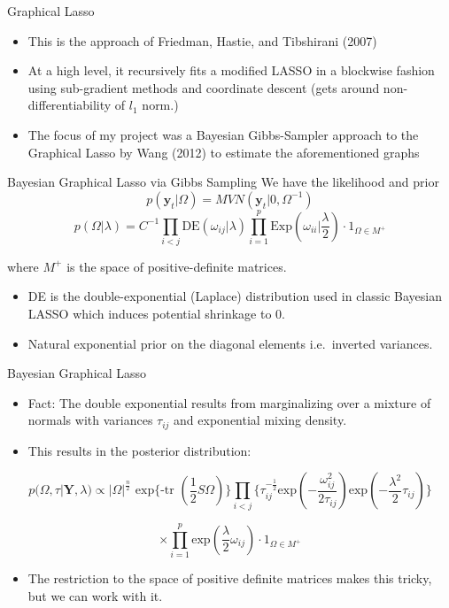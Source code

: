 \documentclass[
  ignorenonframetext,
]{beamer}
\providecommand{\tightlist}{%
  \setlength{\itemsep}{0pt}\setlength{\parskip}{0pt}}
\begin{document}
\begin{frame}{Graphical Lasso}
\label{graphical-lasso-1}
\begin{itemize}
\item
  This is the approach of Friedman, Hastie, and Tibshirani (2007)
\item
  At a high level, it recursively fits a modified LASSO in a blockwise
  fashion using sub-gradient methods and coordinate descent (gets around
  non-differentiability of \(l_1\) norm.)
\item
  The focus of my project was a Bayesian Gibbs-Sampler approach to the
  Graphical Lasso by Wang (2012) to estimate the aforementioned graphs
\end{itemize}
\end{frame}

\begin{frame}{Bayesian Graphical Lasso via Gibbs Sampling}
\label{bayesian-graphical-lasso-via-gibbs-sampling}
We have the likelihood and prior
\[p(\textbf{y}_t | \Omega) = MVN(\textbf{y}_t|0, \Omega^{-1} )\]
\[p(\Omega|\lambda) = C^{-1} \prod_{i<j}\textrm{DE}(\omega_{ij}|\lambda)\prod_{i=1}^p
\textrm{Exp}(\omega_{ii}|\frac{\lambda}{2})\cdot1_{\Omega\in M^+}\]

where \(M^+\) is the space of positive-definite matrices.

\begin{itemize}
\tightlist
\item
  DE is the double-exponential (Laplace) distribution used in classic
  Bayesian LASSO which induces potential shrinkage to 0.
\item
  Natural exponential prior on the diagonal elements i.e.~inverted
  variances.
\end{itemize}
\end{frame}

\begin{frame}{Bayesian Graphical Lasso}
\label{bayesian-graphical-lasso}
\begin{itemize}
\item
  Fact: The double exponential results from marginalizing over a mixture
  of normals with variances \(\tau_{ij}\) and exponential mixing
  density.
\item
  This results in the posterior distribution:
\end{itemize}

\[p(\Omega, \tau|\textbf{Y}, \lambda) \propto |\Omega|^{\frac{n}{2}}\textrm{ exp\{-tr }
(\frac{1}{2}S\Omega)\}\prod_{i<j}\{\tau_{ij}^{-\frac{1}{2}}\textrm{exp}(-\frac{\omega_{ij}^2}{2\tau_{ij}})
\textrm{exp}(-\frac{\lambda^2}{2}\tau_{ij})\}\]

\[\times\prod_{i=1}^p\textrm{exp}(\frac{\lambda}{2}\omega_{ij})\cdot1_{\Omega\in M^+}\]

\begin{itemize}
\tightlist
\item
  The restriction to the space of positive definite matrices makes this
  tricky, but we can work with it.
\end{itemize}
\end{frame}
\end{document}
